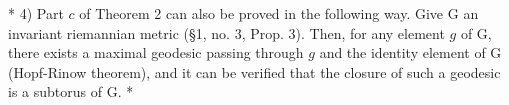 * 4) Part \(c\) of Theorem 2 can also be proved in the following way. Give G an invariant riemannian metric (§1, no. 3, Prop. 3). Then, for any element \(g\) of G, there exists a maximal geodesic passing through \(g\) and the identity element of G (Hopf-Rinow theorem), and it can be verified that the closure of such a geodesic is a subtorus of G. *

